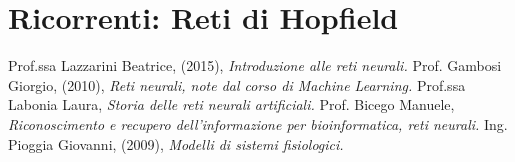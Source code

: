 \documentclass[12pt,a4paper,oneside]{book}
\begin{document}
	
	\chapter{Ricorrenti: Reti di Hopfield}

\clearpage 
\begin{thebibliography}{9} 
	 Prof.ssa Lazzarini Beatrice, (2015), \emph{Introduzione alle reti neurali.}
	 Prof. Gambosi Giorgio, (2010), \emph{Reti neurali, note dal corso di Machine Learning.}
	 Prof.ssa Labonia Laura, \emph{Storia delle reti neurali artificiali.}
	 Prof. Bicego Manuele, \emph{Riconoscimento e recupero dell’informazione per bioinformatica, reti neurali.}
	 Ing. Pioggia Giovanni, (2009), \emph{Modelli di sistemi fisiologici.}
 \end{thebibliography}
	
\end{document}
